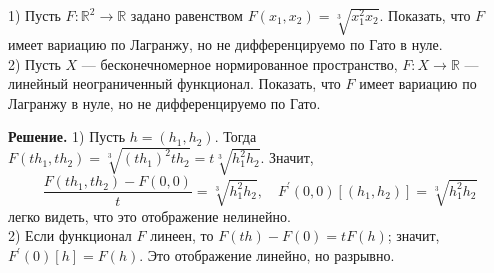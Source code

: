 \begin{task}
    1) Пусть $F: \mathbb{R}^2 \rightarrow \mathbb{R}$ задано равенством $F\left(x_1, x_2\right)=\sqrt[3]{x_1^2 x_2}$. 
    Показать, что $F$ имеет вариацию по Лагранжу, но не дифференцируемо по Гато в нуле. 
    \\
    2) Пусть $X$ --- бесконечномерное нормированное пространство, $F: X \rightarrow \mathbb{R}$ 
    --- линейный неограниченный функционал. Показать, что $F$ имеет вариацию по Лагранжу в нуле, 
    но не дифференцируемо по Гато.
    
    \textbf{Решение.} 1) Пусть $h = \left( h_1, h_2 \right)$. 
    Тогда $F\left(t h_1, t h_2\right)=\sqrt[3]{\left(t h_1\right)^{2} t h_2}=t \sqrt[3]{h_1^2 h_2}$. Значит,
    \[ 
    \frac{F\left(t h_1, t h_2\right)-F(0,0)}{t}=\sqrt[3]{h_1^2 h_2}, \quad F^{\prime}(0,0)\left[\left(h_1, h_2\right)\right]=\sqrt[3]{h_1^2 h_2}
    \]  
    легко видеть, что это отображение нелинейно.\\
    2) Если функционал $F$ линеен, то $F(t h)-F(0)=t F(h)$; значит, $F^{\prime}(0)[h]=F(h)$. Это отображение линейно, но разрывно.
    
    \end{task}